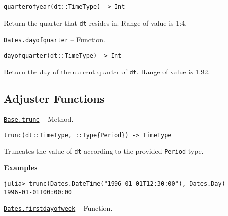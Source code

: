 \begin{adjustwidth}{2em}{0pt}


\begin{verbatim}
quarterofyear(dt::TimeType) -> Int
\end{verbatim}

Return the quarter that \texttt{dt} resides in. Range of value is 1:4.



\end{adjustwidth}
\hypertarget{10496844318360486693}{}
\hyperlink{10496844318360486693}{\texttt{Dates.dayofquarter}}  -- {Function.}

\begin{adjustwidth}{2em}{0pt}


\begin{verbatim}
dayofquarter(dt::TimeType) -> Int
\end{verbatim}

Return the day of the current quarter of \texttt{dt}. Range of value is 1:92.



\end{adjustwidth}

\hypertarget{8847679603742752911}{}


\subsection{Adjuster Functions}


\hypertarget{7860888335787903955}{}
\hyperlink{7860888335787903955}{\texttt{Base.trunc}}  -- {Method.}

\begin{adjustwidth}{2em}{0pt}


\begin{verbatim}
trunc(dt::TimeType, ::Type{Period}) -> TimeType
\end{verbatim}

Truncates the value of \texttt{dt} according to the provided \texttt{Period} type.

\textbf{Examples}


\begin{verbatim}
julia> trunc(Dates.DateTime("1996-01-01T12:30:00"), Dates.Day)
1996-01-01T00:00:00
\end{verbatim}



\end{adjustwidth}
\hypertarget{725369720992290901}{}
\hyperlink{725369720992290901}{\texttt{Dates.firstdayofweek}}  -- {Function.}

